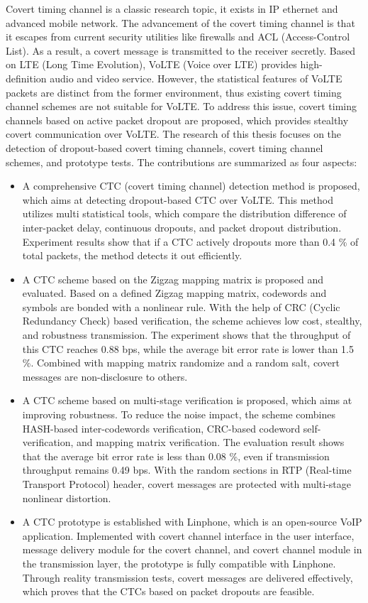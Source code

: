 \begin{englishabstract}

   Covert timing channel is a classic research topic, it exists in IP ethernet and advanced mobile network. The advancement of the covert timing channel is that it escapes from current security utilities like firewalls and ACL (Access-Control List). As a result, a covert message is transmitted to the receiver secretly. Based on LTE (Long Time Evolution), VoLTE (Voice over LTE) provides high-definition audio and video service. However, the statistical features of VoLTE packets are distinct from the former environment, thus existing covert timing channel schemes are not suitable for VoLTE. To address this issue, covert timing channels based on active packet dropout are proposed, which provides stealthy covert communication over VoLTE. The research of this thesis focuses on the detection of dropout-based covert timing channels, covert timing channel schemes, and prototype tests. The contributions are summarized as four aspects: 
\begin{itemize}
   \item A comprehensive CTC (covert timing channel) detection method is proposed, which aims at detecting dropout-based CTC over VoLTE. This method utilizes multi statistical tools, which compare the distribution difference of inter-packet delay, continuous dropouts, and packet dropout distribution. Experiment results show that if a CTC actively dropouts more than 0.4 \% of total packets, the method detects it out efficiently.
   \item A CTC scheme based on the Zigzag mapping matrix is proposed and evaluated. Based on a defined Zigzag mapping matrix, codewords and symbols are bonded with a nonlinear rule. With the help of CRC (Cyclic Redundancy Check) based verification, the scheme achieves low cost, stealthy, and robustness transmission. The experiment shows that the throughput of this CTC reaches 0.88 bps, while the average bit error rate is lower than 1.5 \%. Combined with mapping matrix randomize and a random salt, covert messages are non-disclosure to others.
   \item A CTC scheme based on multi-stage verification is proposed, which aims at improving robustness. To reduce the noise impact, the scheme combines HASH-based inter-codewords verification, CRC-based codeword self-verification, and mapping matrix verification. The evaluation result shows that the average bit error rate is less than 0.08 \%, even if transmission throughput remains 0.49 bps. With the random sections in RTP (Real-time Transport Protocol) header, covert messages are protected with multi-stage nonlinear distortion.
   \item A CTC prototype is established with Linphone, which is an open-source VoIP application. Implemented with covert channel interface in the user interface, message delivery module for the covert channel, and covert channel module in the transmission layer, the prototype is fully compatible with Linphone. Through reality transmission tests, covert messages are delivered effectively, which proves that the CTCs based on packet dropouts are feasible.
\end{itemize}
   
\end{englishabstract}
